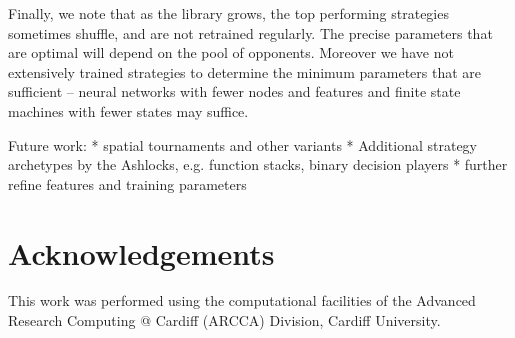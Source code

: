 \documentclass{article}
\begin{document}
Finally, we note that as the library grows, the top performing strategies
sometimes shuffle, and are not retrained regularly. The precise parameters
that are optimal will depend on the pool of opponents. Moreover we have not
extensively trained strategies to determine the minimum parameters that are
sufficient -- neural networks with fewer nodes and features and finite state
machines with fewer states may suffice.


Future work:
* spatial tournaments and other variants
* Additional strategy archetypes by the Ashlocks, e.g. function stacks, binary
decision players
* further refine features and training parameters


\section*{Acknowledgements}

This work was performed using the computational facilities of the Advanced
Research Computing @ Cardiff (ARCCA) Division, Cardiff University.

\printbibliography
\end{document}

